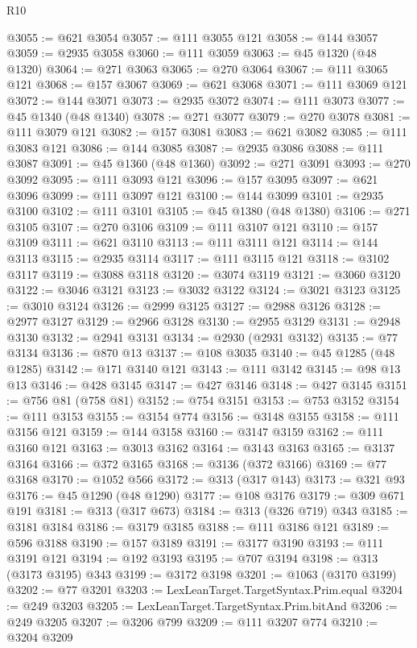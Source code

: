 \begin{lexlean}{R10}
\begin{coremodule}
{{{{{{{{{{{{{{{{{{{{{{{{{{{{{{{{{{{{{{{{{{{{{{{{{{{{{{{{{{{{{{{{{{{{{{{{{{{{{{{{{{{{{{{{{{{{{{{{{{{{{{{{{{{{@3055 := @621 @3054
@3057 := @111 @3055 @121
@3058 := @144 @3057
@3059 := @2935 @3058
@3060 := @111 @3059
@3063 := @45 @1320 (@48 @1320)
@3064 := @271 @3063
@3065 := @270 @3064
@3067 := @111 @3065 @121
@3068 := @157 @3067
@3069 := @621 @3068
@3071 := @111 @3069 @121
@3072 := @144 @3071
@3073 := @2935 @3072
@3074 := @111 @3073
@3077 := @45 @1340 (@48 @1340)
@3078 := @271 @3077
@3079 := @270 @3078
@3081 := @111 @3079 @121
@3082 := @157 @3081
@3083 := @621 @3082
@3085 := @111 @3083 @121
@3086 := @144 @3085
@3087 := @2935 @3086
@3088 := @111 @3087
@3091 := @45 @1360 (@48 @1360)
@3092 := @271 @3091
@3093 := @270 @3092
@3095 := @111 @3093 @121
@3096 := @157 @3095
@3097 := @621 @3096
@3099 := @111 @3097 @121
@3100 := @144 @3099
@3101 := @2935 @3100
@3102 := @111 @3101
@3105 := @45 @1380 (@48 @1380)
@3106 := @271 @3105
@3107 := @270 @3106
@3109 := @111 @3107 @121
@3110 := @157 @3109
@3111 := @621 @3110
@3113 := @111 @3111 @121
@3114 := @144 @3113
@3115 := @2935 @3114
@3117 := @111 @3115 @121
@3118 := @3102 @3117
@3119 := @3088 @3118
@3120 := @3074 @3119
@3121 := @3060 @3120
@3122 := @3046 @3121
@3123 := @3032 @3122
@3124 := @3021 @3123
@3125 := @3010 @3124
@3126 := @2999 @3125
@3127 := @2988 @3126
@3128 := @2977 @3127
@3129 := @2966 @3128
@3130 := @2955 @3129
@3131 := @2948 @3130
@3132 := @2941 @3131
@3134 := @2930 (@2931 @3132)
@3135 := @77 @3134
@3136 := @870 @13
@3137 := @108 @3035
@3140 := @45 @1285 (@48 @1285)
@3142 := @171 @3140 @121
@3143 := @111 @3142
@3145 := @98 @13 @13
@3146 := @428 @3145
@3147 := @427 @3146
@3148 := @427 @3145
@3151 := @756 @81 (@758 @81)
@3152 := @754 @3151
@3153 := @753 @3152
@3154 := @111 @3153
@3155 := @3154 @774
@3156 := @3148 @3155
@3158 := @111 @3156 @121
@3159 := @144 @3158
@3160 := @3147 @3159
@3162 := @111 @3160 @121
@3163 := @3013 @3162
@3164 := @3143 @3163
@3165 := @3137 @3164
@3166 := @372 @3165
@3168 := @3136 (@372 @3166)
@3169 := @77 @3168
@3170 := @1052 @566
@3172 := @313 (@317 @143)
@3173 := @321 @93
@3176 := @45 @1290 (@48 @1290)
@3177 := @108 @3176
@3179 := @309 @671 @191
@3181 := @313 (@317 @673)
@3184 := @313 (@326 @719) @343
@3185 := @3181 @3184
@3186 := @3179 @3185
@3188 := @111 @3186 @121
@3189 := @596 @3188
@3190 := @157 @3189
@3191 := @3177 @3190
@3193 := @111 @3191 @121
@3194 := @192 @3193
@3195 := @707 @3194
@3198 := @313 (@3173 @3195) @343
@3199 := @3172 @3198
@3201 := @1063 (@3170 @3199)
@3202 := @77 @3201
@3203 := LexLeanTarget.TargetSyntax.Prim.equal
@3204 := @249 @3203
@3205 := LexLeanTarget.TargetSyntax.Prim.bitAnd
@3206 := @249 @3205
@3207 := @3206 @799
@3209 := @111 @3207 @774
@3210 := @3204 @3209
}}}}}}}}}}}}}}}}}}}}}}}}}}}}}}}}}}}}}}}}}}}}}}}}}}}}}}}}}}}}}}}}}}}}}}}}}}}}}}}}}}}}}}}}}}}}}}}}}}}}}}}}}}}}
\end{coremodule}
\end{lexlean}
